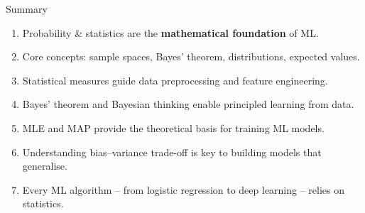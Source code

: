 \begin{frame}{Summary}
\begin{enumerate}
    \item Probability \& statistics are the \textbf{mathematical foundation} of ML.
    \item Core concepts: sample spaces, Bayes' theorem, distributions, expected values.
    \item Statistical measures guide data preprocessing and feature engineering.
    \item Bayes' theorem and Bayesian thinking enable principled learning from data.
    \item MLE and MAP provide the theoretical basis for training ML models.
    \item Understanding bias--variance trade-off is key to building models that generalise.
    \item Every ML algorithm -- from logistic regression to deep learning -- relies on statistics.
\end{enumerate}
\end{frame}
